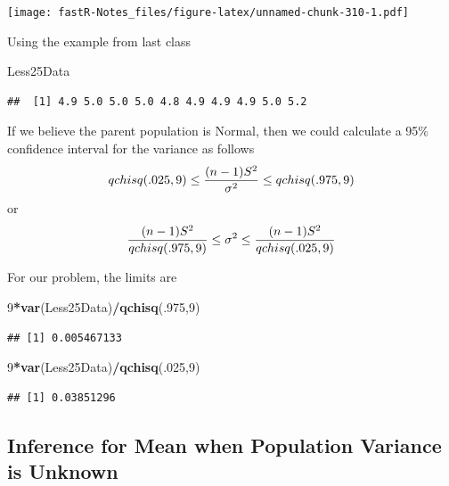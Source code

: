 \documentclass[]{book}
\newenvironment{Shaded}{\begin{snugshade}}{\end{snugshade}}
\newcommand{\KeywordTok}[1]{\textcolor[rgb]{0.13,0.29,0.53}{\textbf{#1}}}
\newcommand{\DecValTok}[1]{\textcolor[rgb]{0.00,0.00,0.81}{#1}}
\newcommand{\OperatorTok}[1]{\textcolor[rgb]{0.81,0.36,0.00}{\textbf{#1}}}
\newcommand{\NormalTok}[1]{#1}
\theoremstyle{definition}
\theoremstyle{definition}
\theoremstyle{definition}
\theoremstyle{remark}
\begin{document}
\texttt{[image: fastR-Notes\_files/figure-latex/unnamed-chunk-310-1.pdf]}

Using the example from last class

\begin{Shaded}
\begin{Highlighting}[]
\NormalTok{Less25Data}
\end{Highlighting}
\end{Shaded}

\begin{verbatim}
##  [1] 4.9 5.0 5.0 5.0 4.8 4.9 4.9 4.9 5.0 5.2
\end{verbatim}

If we believe the parent population is Normal, then we could calculate a
95\% confidence interval for the variance as follows
\[qchisq(.025,9) \leq {(n-1)S^{2} \over \sigma ^{2}} \leq qchisq(.975,9)\]
or
\[{(n-1)S^{2} \over qchisq(.975,9)} \leq \sigma ^{2} \leq {(n-1)S^{2} \over qchisq(.025,9)}\]

For our problem, the limits are

\begin{Shaded}
\begin{Highlighting}[]
\DecValTok{9}\OperatorTok{*}\KeywordTok{var}\NormalTok{(Less25Data)}\OperatorTok{/}\KeywordTok{qchisq}\NormalTok{(.}\DecValTok{975}\NormalTok{,}\DecValTok{9}\NormalTok{)}
\end{Highlighting}
\end{Shaded}

\begin{verbatim}
## [1] 0.005467133
\end{verbatim}

\begin{Shaded}
\begin{Highlighting}[]
\DecValTok{9}\OperatorTok{*}\KeywordTok{var}\NormalTok{(Less25Data)}\OperatorTok{/}\KeywordTok{qchisq}\NormalTok{(.}\DecValTok{025}\NormalTok{,}\DecValTok{9}\NormalTok{)}
\end{Highlighting}
\end{Shaded}

\begin{verbatim}
## [1] 0.03851296
\end{verbatim}

\subsection{Inference for Mean when Population Variance is
Unknown}\label{inference-for-mean-when-population-variance-is-unknown}
\end{document}
